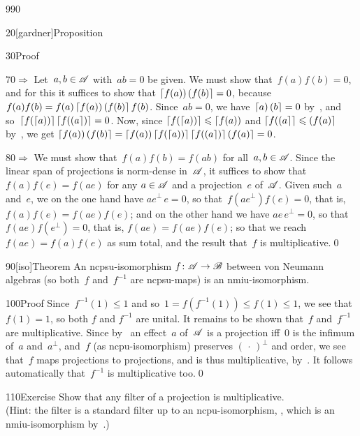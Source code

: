 \begin{parsec}{990}
\begin{point}{20}[gardner]{Proposition}
\begin{point}{30}{Proof}
\begin{point}{70}{$\Longrightarrow$}
Let~$a,b\in\mathscr{A}$ with~$ab=0$ be given.
We must show that~$f(a)f(b)=0$,
and for this it suffices to show that
$\left\lceil f(a)\right)\left(f(b)\right\rceil=0$,
because $f(a)f(b)=f(a)\left\lceil f(a)\right)\left(f(b)\right\rceil f(b)$.
Since~$ab=0$,
we have~$\left\lceil a\right)\left(b\right\rceil=0$ by~,
and so~$\left\lceil f(\left\lceil a\right))\right\rceil\left\lceil f(\left(a\right\rceil)\right\rceil=0$.
Now,
since $\left\lceil f(\left\lceil a\right))\right\rceil\leqslant \left\lceil f(a)\right)$
	and $\left\lceil f(\left(a\right\rceil\right\rceil\leqslant \left(f(a)\right\rceil$
	by~,
we get $\left\lceil f(a)\right)\left(f(b)\right\rceil
	= \left\lceil f(a)\right) \left\lceil f(\left\lceil a\right))\right\rceil
	\left\lceil f(\left(a\right\rceil)\right\rceil
	\left(f(a)\right\rceil
	=0$.
\end{point}
\begin{point}{80}{$\Longrightarrow$}%
We must show that~$f(a)f(b)=f(ab)$
for all~$a,b\in \mathscr{A}$.
Since the linear span of projections is norm-dense in~$\mathscr{A}$,
it suffices to show that $f(a)f(e)=f(ae)$
for any $a\in\mathscr{A}$ and a projection~$e$ of~$\mathscr{A}$.
Given such~$a$ and~$e$,
we on the one hand have $ae^\perp\, e=0$,
so that~$f(ae^\perp)f(e)=0$,
that is, $f(a)f(e)=f(ae)f(e)$;
and on the other hand
we have $ae\,e^\perp=0$,
so that~$f(ae)f(e^\perp)=0$,
that is, $f(ae)=f(ae)f(e)$;
so that we reach~$f(ae)=f(a)f(e)$ as sum total,
and the result that~$f$ is multiplicative.\qed
\end{point}
\end{point}
\end{point}
\begin{point}{90}[iso]{Theorem}%
An ncpsu-isomorphism $f\colon \mathscr{A}\to\mathscr{B}$
between von Neumann algebras 
(so both~$f$ and~$f^{-1}$ are ncpsu-maps)
is an nmiu-isomorphism.
\begin{point}{100}{Proof}%
Since~$f^{-1}(1)\leq 1$
and so~$1=f(f^{-1}(1))\leq f(1)\leq 1$,
we see that~$f(1)=1$, so both $f$ and $f^{-1}$ are unital.
It remains to be shown that~$f$ and~$f^{-1}$ are multiplicative.
Since by~ an effect~$a$ of~$\mathscr{A}$
is a projection iff~$0$ is the infimum of~$a$ and~$a^\perp$,
	and~$f$ (as ncpu-isomorphism) preserves $(\,\cdot\,)^\perp$
	and order,
we see that~$f$ maps projections to projections,
and is thus multiplicative, by~.
It follows automatically that~$f^{-1}$ is multiplicative too.\qed
\end{point}
\end{point}
\begin{point}{110}{Exercise}%
Show that any filter of a projection is multiplicative.\\
(Hint: the filter is
a standard filter
up to an
ncpu-isomorphism, ,
which is an nmiu-isomorphism by~.)

\end{point}
\end{parsec}
